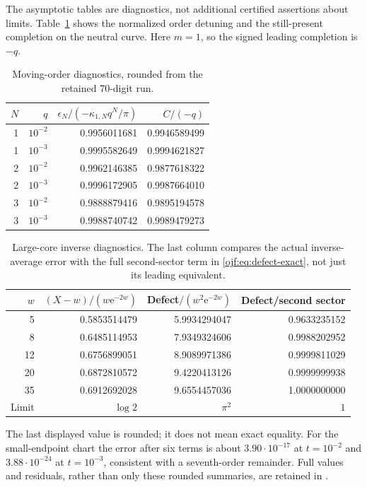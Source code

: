 \documentclass[11pt,a4paper]{article}
\numberwithin{equation}{section}
\theoremstyle{definition}\newtheorem{definition}[theorem]{Definition}
\theoremstyle{remark}\newtheorem{remark}[theorem]{Remark}
\newcommand{\ee}{\mathrm e}\newcommand{\ii}{\mathrm i}\newcommand{\dd}{\,\mathrm d}
\begin{document}
The asymptotic tables are diagnostics, not additional certified
assertions about limits. Table~\ref{ojf:tab:neutral} shows the normalized
order detuning and the still-present completion on the neutral curve.
Here $m=1$, so the signed leading completion is $-q$.
\begin{table}[htbp]\centering\small
\caption{Moving-order diagnostics, rounded from the retained 70-digit run.}
\label{ojf:tab:neutral}
\begin{tabular}{@{}rrrr@{}}\toprule
$N$ & $q$ & $\epsilon_N/(-\kappa_{1,N}q^N/\pi)$ & $C/(-q)$\\\midrule
1 & $10^{-2}$ & 0.9956011681 & 0.9946589499\\
1 & $10^{-3}$ & 0.9995582649 & 0.9994621827\\
2 & $10^{-2}$ & 0.9962146385 & 0.9877618322\\
2 & $10^{-3}$ & 0.9996172905 & 0.9987664010\\
3 & $10^{-2}$ & 0.9888879416 & 0.9895194578\\
3 & $10^{-3}$ & 0.9988740742 & 0.9989479273\\\bottomrule
\end{tabular}
\end{table}

\begin{table}[htbp]\centering\small
\caption{Large-core inverse diagnostics. The last column compares the
actual inverse-average error with the full second-sector term in
\eqref{ojf:eq:defect-exact}, not just its leading equivalent.}
\label{ojf:tab:inverse}
\begin{tabular}{@{}rrrr@{}}\toprule
$w$ & $(X-w)/(w\ee^{-2w})$ & Defect$/ (w^2\ee^{-2w})$
 & Defect/second sector\\\midrule
5  & 0.5853514479 & 5.9934294047 & 0.9633235152\\
8  & 0.6485114953 & 7.9349324606 & 0.9988202952\\
12 & 0.6756899051 & 8.9089971386 & 0.9999811029\\
20 & 0.6872810572 & 9.4220413126 & 0.9999999938\\
35 & 0.6912692028 & 9.6554457036 & 1.0000000000\\\midrule
Limit & $\log2$ & $\pi^2$ & $1$\\\bottomrule
\end{tabular}
\end{table}
The last displayed value is rounded; it does not mean exact equality.
For the small-endpoint chart the error after six terms is about
$3.90\cdot10^{-17}$ at $t=10^{-2}$ and $3.88\cdot10^{-24}$ at
$t=10^{-3}$, consistent with a seventh-order remainder. Full values and
residuals, rather than only these rounded summaries, are retained in
.
\end{document}
